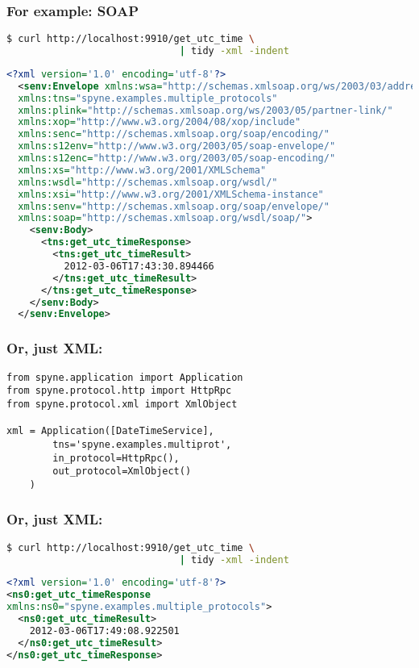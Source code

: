 \documentclass{beamer}
\begin{document}
\begin{frame}[fragile]
  \frametitle{For example: SOAP}

  \begin{lstlisting}[language=sh,frame=topline]
$ curl http://localhost:9910/get_utc_time \
                              | tidy -xml -indent
  \end{lstlisting}
  \tiny
  \begin{lstlisting}[language=xml,frame=bottomline]
  <?xml version='1.0' encoding='utf-8'?>
  <senv:Envelope xmlns:wsa="http://schemas.xmlsoap.org/ws/2003/03/addressing"
  xmlns:tns="spyne.examples.multiple_protocols"
  xmlns:plink="http://schemas.xmlsoap.org/ws/2003/05/partner-link/"
  xmlns:xop="http://www.w3.org/2004/08/xop/include"
  xmlns:senc="http://schemas.xmlsoap.org/soap/encoding/"
  xmlns:s12env="http://www.w3.org/2003/05/soap-envelope/"
  xmlns:s12enc="http://www.w3.org/2003/05/soap-encoding/"
  xmlns:xs="http://www.w3.org/2001/XMLSchema"
  xmlns:wsdl="http://schemas.xmlsoap.org/wsdl/"
  xmlns:xsi="http://www.w3.org/2001/XMLSchema-instance"
  xmlns:senv="http://schemas.xmlsoap.org/soap/envelope/"
  xmlns:soap="http://schemas.xmlsoap.org/wsdl/soap/">
    <senv:Body>
      <tns:get_utc_timeResponse>
        <tns:get_utc_timeResult>
          2012-03-06T17:43:30.894466
        </tns:get_utc_timeResult>
      </tns:get_utc_timeResponse>
    </senv:Body>
  </senv:Envelope>
  \end{lstlisting}
\end{frame}

\begin{frame}[fragile]
  \frametitle{Or, just XML:}

  \begin{lstlisting}
from spyne.application import Application
from spyne.protocol.http import HttpRpc
from spyne.protocol.xml import XmlObject

xml = Application([DateTimeService],
        tns='spyne.examples.multiprot',
        in_protocol=HttpRpc(),
        out_protocol=XmlObject()
    )
  \end{lstlisting}
\end{frame}


\begin{frame}[fragile]
  \frametitle{Or, just XML:}

  \begin{lstlisting}[language=sh,frame=topline]
$ curl http://localhost:9910/get_utc_time \
                              | tidy -xml -indent
  \end{lstlisting}
  \small
  \begin{lstlisting}[language=xml,frame=bottomline]
<?xml version='1.0' encoding='utf-8'?>
<ns0:get_utc_timeResponse
xmlns:ns0="spyne.examples.multiple_protocols">
  <ns0:get_utc_timeResult>
    2012-03-06T17:49:08.922501
  </ns0:get_utc_timeResult>
</ns0:get_utc_timeResponse>
  \end{lstlisting}
\end{frame}
\end{document}
